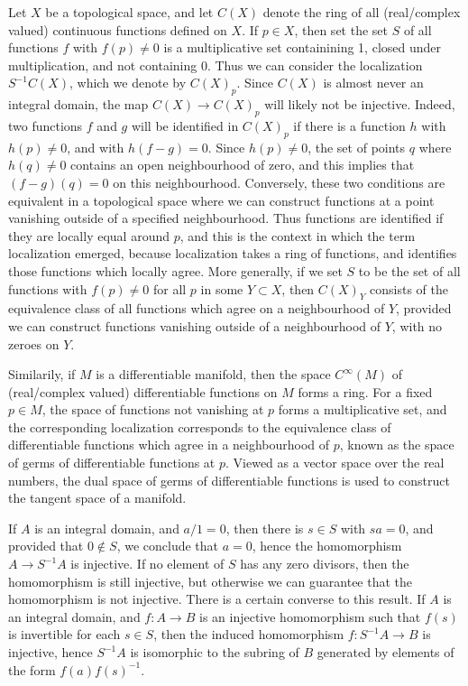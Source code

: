 \begin{example}
    Let $X$ be a topological space, and let $C(X)$ denote the ring of all (real/complex valued) continuous functions defined on $X$. If $p \in X$, then set the set $S$ of all functions $f$ with $f(p) \neq 0$ is a multiplicative set containining 1, closed under multiplication, and not containing 0. Thus we can consider the localization $S^{-1}C(X)$, which we denote by $C(X)_p$. Since $C(X)$ is almost never an integral domain, the map $C(X) \to C(X)_p$ will likely not be injective. Indeed, two functions $f$ and $g$ will be identified in $C(X)_p$ if there is a function $h$ with $h(p) \neq 0$, and with $h(f-g) = 0$. Since $h(p) \neq 0$, the set of points $q$ where $h(q) \neq 0$ contains an open neighbourhood of zero, and this implies that $(f - g)(q) = 0$ on this neighbourhood. Conversely, these two conditions are equivalent in a topological space where we can construct functions at a point vanishing outside of a specified neighbourhood. Thus functions are identified if they are locally equal around $p$, and this is the context in which the term localization emerged, because localization takes a ring of functions, and identifies those functions which locally agree. More generally, if we set $S$ to be the set of all functions with $f(p) \neq 0$ for all $p$ in some $Y \subset X$, then $C(X)_Y$ consists of the equivalence class of all functions which agree on a neighbourhood of $Y$, provided we can construct functions vanishing outside of a neighbourhood of $Y$, with no zeroes on $Y$.
\end{example}

\begin{example}
    Similarily, if $M$ is a differentiable manifold, then the space $C^\infty(M)$ of (real/complex valued) differentiable functions on $M$ forms a ring. For a fixed $p \in M$, the space of functions not vanishing at $p$ forms a multiplicative set, and the corresponding localization corresponds to the equivalence class of differentiable functions which agree in a neighbourhood of $p$, known as the space of germs of differentiable functions at $p$. Viewed as a vector space over the real numbers, the dual space of germs of differentiable functions is used to construct the tangent space of a manifold.
\end{example}

If $A$ is an integral domain, and $a/1 = 0$, then there is $s \in S$ with $sa = 0$, and provided that $0 \not \in S$, we conclude that $a = 0$, hence the homomorphism $A \to S^{-1}A$ is injective. If no element of $S$ has any zero divisors, then the homomorphism is still injective, but otherwise we can guarantee that the homomorphism is not injective. There is a certain converse to this result. If $A$ is an integral domain, and $f: A \to B$ is an injective homomorphism such that $f(s)$ is invertible for each $s \in S$, then the induced homomorphism $f: S^{-1}A \to B$ is injective, hence $S^{-1}A$ is isomorphic to the subring of $B$ generated by elements of the form $f(a)f(s)^{-1}$.

